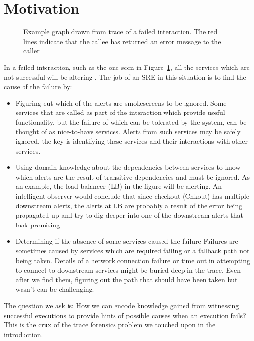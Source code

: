 \section{Motivation}
\begin{figure}[h]
\caption{Example graph drawn from trace of a failed interaction. The red lines indicate that the callee has returned an error message to the caller}
\label{Failed_ex}
\end{figure}

In a failed interaction, such as the one seen in Figure~\ref{Failed_ex}, all the services which are not successful will be altering . The job of an SRE in this situation is to find the cause of the failure by:
\begin{itemize}
\item Figuring out which of the alerts  are smokescreens to be ignored. \newline
Some services that are called as part of the interaction which provide useful functionality, but the failure of which can be tolerated by the system, can be thought of as nice-to-have services. Alerts from such services may be safely ignored, the key is identifying these services and their interactions with other services. 
\item Using domain knowledge about the dependencies between services to know which alerts are the result of transitive dependencies and must be ignored. \newline
As an example, the load balancer (LB) in the figure will be alerting. An intelligent observer would conclude that since checkout (Chkout) has multiple downstream alerts, the alerts at LB are probably a result of the error being propagated up and try to dig deeper into one of the downstream alerts that look promising.
\item Determining if the absence of some services caused the failure \newline
Failures are sometimes caused by services which are required failing or a fallback path not being taken. Details of a network connection failure or time out in attempting to connect to downstream services might be buried deep in the trace. Even after we find them, figuring out the path that should have been taken but wasn't can be challenging. 
\end{itemize}
The question we ask is: How we can encode knowledge gained from witnessing successful executions to provide hints of possible causes when an execution fails? This is the crux of the trace forensics problem we touched upon in the introduction.
